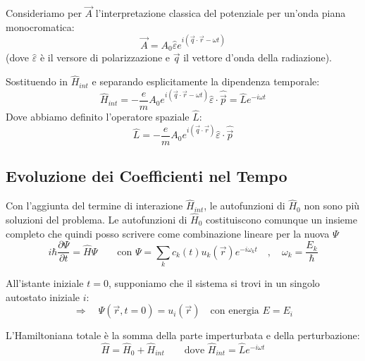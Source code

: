 \documentclass[11pt, a4paper]{article}
\begin{document}
\noindent
Consideriamo per $\vec{A}$ l'interpretazione classica del potenziale per un'onda piana monocromatica: %
\begin{equation*}
    \vec{A} = A_0 \hat{\varepsilon} e^{i(\vec{q}\cdot\vec{r} - \omega t)} %
\end{equation*}
(dove $\hat{\varepsilon}$ è il versore di polarizzazione e $\vec{q}$ il vettore d'onda della radiazione). %

\noindent
Sostituendo in $\hat{H}_{int}$ e separando esplicitamente la dipendenza temporale: %
\begin{equation}
    \hat{H}_{int} = - \frac{e}{m} A_0 e^{i(\vec{q}\cdot\vec{r} - \omega t)} \hat{\varepsilon} \cdot \hat{\vec{p}} = \hat{L} e^{-i\omega t} %
\end{equation}
Dove abbiamo definito l'operatore spaziale $\hat{L}$: %
\begin{equation}
    \boxed{ \hat{L} = - \frac{e}{m} A_0 e^{i(\vec{q}\cdot\vec{r})} \hat{\varepsilon} \cdot \hat{\vec{p}} } %
\end{equation}

\subsection{Evoluzione dei Coefficienti nel Tempo} %

Con l'aggiunta del termine di interazione $\hat{H}_{int}$, le autofunzioni di $\hat{H}_0$ non sono più soluzioni del problema. Le autofunzioni di $\hat{H}_0$ costituiscono comunque un insieme completo che quindi posso scrivere come combinazione lineare per la nuova $\Psi$ %
\begin{equation}
    i\hbar \frac{\partial \Psi}{\partial t} = \hat{H} \Psi \qquad \text{con } \Psi = \sum_k c_k(t) u_k(\vec{r}) e^{-i\omega_k t} \quad , \quad \omega_k = \frac{E_k}{\hbar} %
\end{equation}

\noindent
All'istante iniziale $t=0$, supponiamo che il sistema si trovi in un singolo autostato iniziale $i$: %
\begin{equation*}
    \Rightarrow \quad \Psi(\vec{r}, t=0) = u_i(\vec{r}) \quad \text{con energia } E = E_i %
\end{equation*}

L'Hamiltoniana totale è la somma della parte imperturbata e della perturbazione: %
\begin{equation*}
    \hat{H} = \hat{H}_0 + \hat{H}_{int} \qquad \text{dove } \hat{H}_{int} = \hat{L} e^{-i\omega t} %
\end{equation*}
\end{document}
